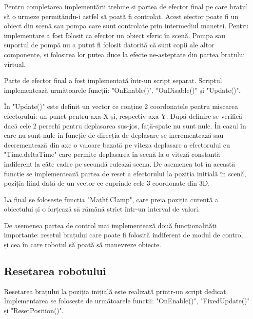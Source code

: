 Pentru completarea implementării trebuie și partea de efector final pe care brațul să o urmeze permițându-i astfel să poată fi controlat. Acest efector poate fi un obiect din scenă sau pompa care sunt controlate prin intermediul manetei. Pentru implementare a fost folosit ca efector un obiect sferic în scenă. Pompa sau suportul de pompă nu a putut fi folosit datorită că sunt copii ale altor componente, și folosirea lor putea duce la efecte ne-așteptate din partea brațului virtual.

Parte de efector final a fost implementată într-un script separat. Scriptul  implementează următoarele funcții: "OnEnable()", "OnDisable()" și  "Update()".

În "Update()" este definit un vector ce conține 2  coordonatele pentru mișcarea efectorului: un punct pentru axa X și, respectiv axa Y. După definire se verifică dacă cele 2 perechi pentru deplasarea sus-jos, față-spate nu sunt nule. În cazul în care nu sunt nule în funcție de direcția de deplasare se incrementează sau decrementează din axe o valoare bazată pe viteza deplasare a efectorului cu  "Time.deltaTime" care permite deplasarea în scenă la o viteză constantă indiferent la câte cadre pe secundă rulează scena. De asemenea tot în această funcție se implementează partea de reset a efectorului la poziția inițială în scenă, poziția fiind dată de un vector ce cuprinde cele 3 coordonate din 3D. 

 La final se folosește funcția "Mathf.Clamp", care preia poziția curentă a obiectului și o forțează să rămână strict într-un interval de valori.
 
  

De asemenea partea de control mai implementează două funcționalități importante: resetul  brațului care poate fi folosită indiferent de modul de control și cea în care robotul să poată să manevreze obiecte.

\subsection{Resetarea robotului}
Resetarea brațului la poziția inițială este realizată printr-un script dedicat. Implementarea se folosește de următoarele funcții: "OnEnable()", "FixedUpdate()" și  "ResetPosition()". 

